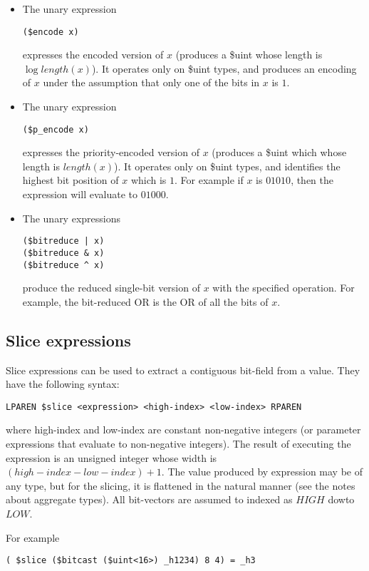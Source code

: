 \documentclass{article}
\begin{document}
\begin{itemize}
\item The unary expression
\begin{verbatim}
($encode x)
\end{verbatim}
expresses the encoded version of $x$ (produces a \$uint 
whose length is $\log{length(x)}$).  It operates only on \$uint types,
and produces an encoding of $x$ under the assumption that only
one of the bits in $x$ is $1$.
\item The unary expression 
\begin{verbatim}
($p_encode x)
\end{verbatim}
expresses the priority-encoded version of $x$ (produces a \$uint which
whose length is $length(x)$).  It operates only on \$uint types,
and identifies the highest bit position of $x$ which is $1$. For example
if $x$ is $01010$, then the expression will evaluate to $01000$.
\item The unary expressions
\begin{verbatim}
($bitreduce | x)
($bitreduce & x)
($bitreduce ^ x)
\end{verbatim}
produce the reduced single-bit version of $x$ with the specified operation.
For example, the bit-reduced OR is the OR of all the bits of $x$.
\end{itemize}

\subsection{Slice expressions}

Slice expressions can be used to extract a contiguous
bit-field from a value.  They have the
following syntax:
\begin{verbatim}
LPAREN $slice <expression> <high-index> <low-index> RPAREN
\end{verbatim}
where high-index and low-index are constant non-negative
integers (or parameter expressions that evaluate to
non-negative integers).  The result of executing the expression is
an unsigned integer whose width is $(high-index - low-index)+1$.
The value produced by expression may be of any type, but
for the slicing, it is flattened in the natural manner
(see the notes about aggregate types).  All bit-vectors
are assumed to indexed as $HIGH$ dowto $LOW$.

For example
\begin{verbatim}
( $slice ($bitcast ($uint<16>) _h1234) 8 4) = _h3
\end{verbatim}
\end{document}
